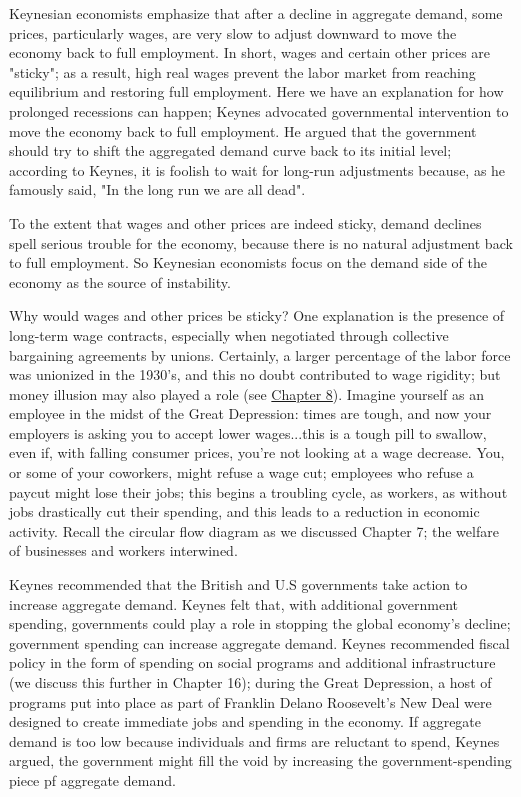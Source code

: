 \documentclass[11pt]{article} %
\begin{document}
Keynesian economists emphasize that after a decline in aggregate demand, some prices, particularly wages, are very slow to adjust downward to move the economy back to full employment. In short, wages and certain other prices are "sticky"; as a result, high real wages prevent the labor market from reaching equilibrium and restoring full employment. Here we have an explanation for how prolonged recessions can happen; Keynes advocated governmental intervention to move the economy back to full employment. He argued that the government should try to shift the aggregated demand curve back to its initial level; according to Keynes, it is foolish to wait for long-run adjustments because, as he famously said, "In the long run we are all dead".

To the extent that wages and other prices are indeed sticky, demand declines spell serious trouble for the economy, because there is no natural adjustment back to full employment. So Keynesian economists focus on the demand side of the economy as the source of instability.

Why would wages and other prices be sticky? One explanation is the presence of long-term wage contracts, especially when negotiated through collective bargaining agreements by unions. Certainly, a larger percentage of the labor force was unionized in the 1930's, and this no doubt contributed to wage rigidity; but money illusion may also played a role (see \underline{Chapter 8}). Imagine yourself as an employee in the midst of the Great Depression: times are tough, and now your employers is asking you to accept lower wages...this is a tough pill to swallow, even if, with falling consumer prices, you're not looking at a 
 wage decrease. You, or some of your coworkers, might refuse a wage cut; employees who refuse a paycut might lose their jobs; this begins a troubling cycle, as workers, as without jobs drastically cut their spending, and this leads to a reduction in economic activity. Recall the circular flow diagram  as we discussed Chapter 7; the welfare of businesses and workers interwined.

Keynes recommended that the British and U.S governments take action to increase aggregate demand. Keynes felt that, with additional government spending, governments could play a role in stopping the global economy's decline; government spending can increase aggregate demand. Keynes recommended fiscal policy in the form of spending on social programs and additional infrastructure (we discuss this further in Chapter 16); during the Great Depression, a host of programs put into place as part of Franklin Delano Roosevelt's New Deal were designed to create immediate jobs and spending in the economy. If aggregate demand is too low because individuals and firms are reluctant to spend, Keynes argued, the government might fill the void by increasing the government-spending piece pf aggregate demand.
\end{document}
